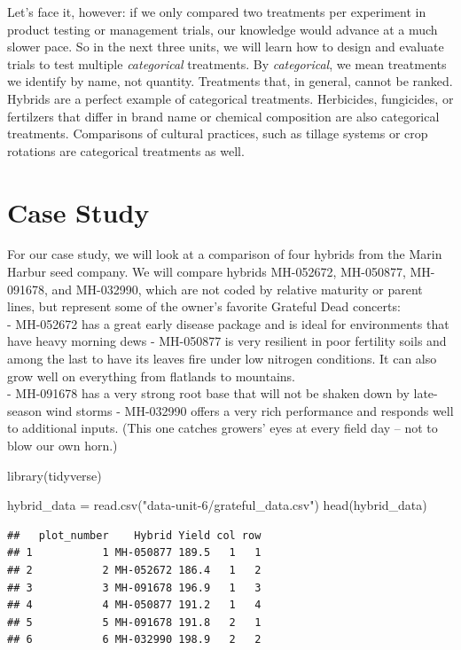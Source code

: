 \documentclass[
]{book}
\newenvironment{Shaded}{\begin{snugshade}}{\end{snugshade}}
\newcommand{\FunctionTok}[1]{\textcolor[rgb]{0.00,0.00,0.00}{#1}}
\newcommand{\NormalTok}[1]{#1}
\newcommand{\OtherTok}[1]{\textcolor[rgb]{0.56,0.35,0.01}{#1}}
\newcommand{\StringTok}[1]{\textcolor[rgb]{0.31,0.60,0.02}{#1}}
\begin{document}
Let's face it, however: if we only compared two treatments per experiment in product testing or management trials, our knowledge would advance at a much slower pace. So in the next three units, we will learn how to design and evaluate trials to test multiple \emph{categorical} treatments. By \emph{categorical}, we mean treatments we identify by name, not quantity. Treatments that, in general, cannot be ranked. Hybrids are a perfect example of categorical treatments. Herbicides, fungicides, or fertilzers that differ in brand name or chemical composition are also categorical treatments. Comparisons of cultural practices, such as tillage systems or crop rotations are categorical treatments as well.

\hypertarget{case-study-3}{%
\section{Case Study}\label{case-study-3}}

For our case study, we will look at a comparison of four hybrids from the Marin Harbur seed company. We will compare hybrids MH-052672, MH-050877, MH-091678, and MH-032990, which are not coded by relative maturity or parent lines, but represent some of the owner's favorite Grateful Dead concerts:\\
- MH-052672 has a great early disease package and is ideal for environments that have heavy morning dews
- MH-050877 is very resilient in poor fertility soils and among the last to have its leaves fire under low nitrogen conditions. It can also grow well on everything from flatlands to mountains.\\
- MH-091678 has a very strong root base that will not be shaken down by late-season wind storms
- MH-032990 offers a very rich performance and responds well to additional inputs. (This one catches growers' eyes at every field day -- not to blow our own horn.)

\begin{Shaded}
\begin{Highlighting}[]
\FunctionTok{library}\NormalTok{(tidyverse)}

\NormalTok{hybrid\_data }\OtherTok{=} \FunctionTok{read.csv}\NormalTok{(}\StringTok{"data{-}unit{-}6/grateful\_data.csv"}\NormalTok{)}
\FunctionTok{head}\NormalTok{(hybrid\_data)}
\end{Highlighting}
\end{Shaded}

\begin{verbatim}
##   plot_number    Hybrid Yield col row
## 1           1 MH-050877 189.5   1   1
## 2           2 MH-052672 186.4   1   2
## 3           3 MH-091678 196.9   1   3
## 4           4 MH-050877 191.2   1   4
## 5           5 MH-091678 191.8   2   1
## 6           6 MH-032990 198.9   2   2
\end{verbatim}
\end{document}
